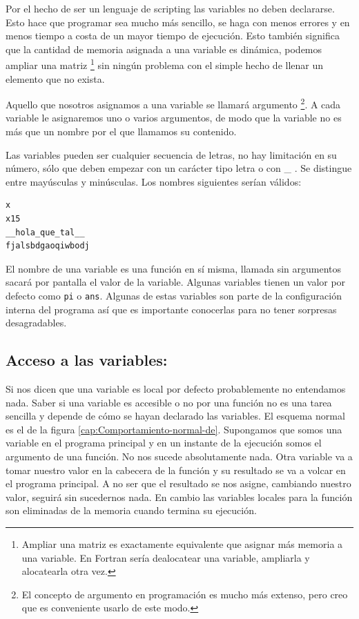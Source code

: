 Por el hecho de ser un lenguaje de scripting las variables no deben
declararse. Esto hace que programar sea mucho más sencillo, se haga
con menos errores y en menos tiempo a costa de un mayor tiempo de
ejecución. Esto también significa que la cantidad de memoria asignada
a una variable es dinámica, podemos ampliar una matriz %
\footnote{Ampliar una matriz es exactamente equivalente que asignar
  más memoria a una variable. En Fortran sería dealocatear una
  variable, ampliarla y alocatearla otra vez.%
} sin ningún problema con el simple hecho de llenar un elemento que no
exista.

Aquello que nosotros asignamos a una variable se llamará argumento%
\footnote{El concepto de argumento en programación es mucho más extenso, pero
creo que es conveniente usarlo de este modo.%
}. A cada variable le asignaremos uno o varios argumentos, de modo
que la variable no es más que un nombre por el que llamamos su contenido.

Las variables pueden ser cualquier secuencia de letras, no hay
limitación en su número, sólo que deben empezar con un carácter tipo
letra o con \_ . Se distingue entre mayúsculas y minúsculas. Los
nombres siguientes serían válidos:

\begin{lstlisting}
x
x15
__hola_que_tal__
fjalsbdgaoqiwbodj
\end{lstlisting}
El nombre de una variable es una función en sí misma, llamada sin
argumentos sacará por pantalla el valor de la variable. Algunas
variables tienen un valor por defecto como \texttt{pi} o \texttt{ans}.
Algunas de estas variables son parte de la configuración interna del
programa así que es importante conocerlas para no tener sorpresas
desagradables.


\subsection{Acceso a las variables:}

Si nos dicen que una variable es local por defecto probablemente no
entendamos nada. Saber si una variable es accesible o no por una
función no es una tarea sencilla y depende de cómo se hayan declarado
las variables. El esquema normal es el de la figura
\ref{cap:Comportamiento-normal-de}.  Supongamos que somos una variable
en el programa principal y en un instante de la ejecución somos el
argumento de una función. No nos sucede absolutamente nada. Otra
variable va a tomar nuestro valor en la cabecera de la función y su
resultado se va a volcar en el programa principal. A no ser que el
resultado se nos asigne, cambiando nuestro valor, seguirá sin
sucedernos nada. En cambio las variables locales para la función son
eliminadas de la memoria cuando termina su ejecución.

